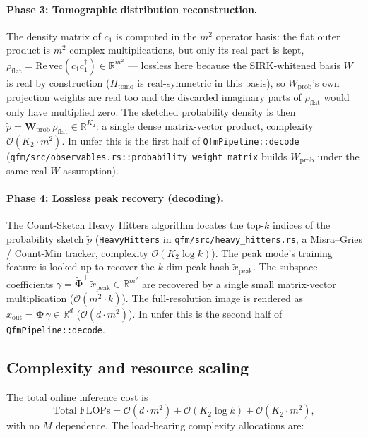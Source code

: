 \documentclass[11pt, a4paper]{article}
\newcommand{\Rset}{\mathbb{R}}
\begin{document}
\paragraph{Phase 3: Tomographic distribution reconstruction.} The density
matrix of $c_1$ is computed in the $m^2$ operator basis: the flat outer
product is $m^2$ complex multiplications, but only its real part is kept,
$\rho_{\mathrm{flat}}=\mathrm{Re}\,\mathrm{vec}(c_1c_1^\dagger)\in\Rset^{m^2}$
--- lossless here because the SIRK-whitened basis $W$ is real by
construction ($\bar H_{\mathrm{tomo}}$ is real-symmetric in this basis), so
$W_{\mathrm{prob}}$'s own projection weights are real too and the discarded
imaginary parts of $\rho_{\mathrm{flat}}$ would only have multiplied zero.
The sketched probability density is then
$\tilde p=\mathbf{W}_{\mathrm{prob}}\,\rho_{\mathrm{flat}}\in\Rset^{K_2}$:
a single dense matrix-vector product, complexity $\mathcal{O}(K_2\cdot m^2)$.
In unfer this is the first half of \texttt{QfmPipeline::decode}
(\texttt{qfm/src/observables.rs::probability\_weight\_matrix} builds
$W_{\mathrm{prob}}$ under the same real-$W$ assumption).

\paragraph{Phase 4: Lossless peak recovery (decoding).} The Count-Sketch
Heavy Hitters algorithm locates the top-$k$ indices of the probability sketch
$\tilde p$ (\texttt{HeavyHitters} in \texttt{qfm/src/heavy\_hitters.rs}, a
Misra--Gries / Count-Min tracker, complexity $\mathcal{O}(K_2\log k)$). The
peak mode's training feature is looked up to recover the $k$-dim peak hash
$\tilde x_{\mathrm{peak}}$. The subspace coefficients
$\gamma=\tilde{\mathbf\Phi}^+\,\tilde x_{\mathrm{peak}}\in\Rset^{m^2}$ are
recovered by a single small matrix-vector multiplication
($\mathcal{O}(m^2\cdot k)$). The full-resolution image is rendered as
$x_{\mathrm{out}}=\mathbf\Phi\,\gamma\in\Rset^d$ ($\mathcal{O}(d\cdot m^2)$).
In unfer this is the second half of \texttt{QfmPipeline::decode}.

\subsection{Complexity and resource scaling}

The total online inference cost is
\begin{equation}
  \mathrm{Total\;FLOPs}=\mathcal{O}(d\cdot m^2)+\mathcal{O}(K_2\log k)
  +\mathcal{O}(K_2\cdot m^2),
\end{equation}
with no $M$ dependence. The load-bearing complexity allocations are:
\end{document}
